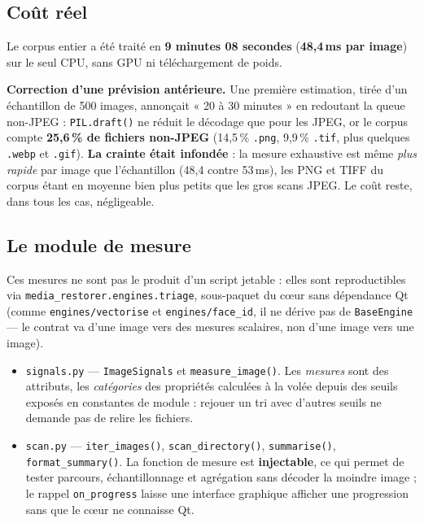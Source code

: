 \documentclass[11pt,a4paper]{article}
\newcommand{\alerte}[1]{\textcolor{alerte}{\textbf{#1}}}
\newcommand{\modtriage}{\texttt{media\_restorer.\allowbreak engines.\allowbreak triage}}
\begin{document}
\subsection{Coût réel}

Le corpus entier a été traité en \textbf{9 minutes 08 secondes}
(\textbf{48,4\,ms par image}) sur le seul CPU, sans GPU ni téléchargement de
poids.

\alerte{Correction d'une prévision antérieure.} Une première estimation, tirée
d'un échantillon de 500 images, annonçait « 20 à 30 minutes » en redoutant la
queue non-JPEG : \texttt{PIL.draft()} ne réduit le décodage que pour les JPEG,
or le corpus compte \textbf{25,6\,\% de fichiers non-JPEG} (14,5\,\%
\texttt{.png}, 9,9\,\% \texttt{.tif}, plus quelques \texttt{.webp} et
\texttt{.gif}). \textbf{La crainte était infondée} : la mesure exhaustive est
même \emph{plus rapide} par image que l'échantillon (48,4 contre 53\,ms), les
PNG et TIFF du corpus étant en moyenne bien plus petits que les gros scans
JPEG. Le coût reste, dans tous les cas, négligeable.

\subsection{Le module de mesure}
\label{sec:module}

Ces mesures ne sont pas le produit d'un script jetable : elles sont
reproductibles via \modtriage{}, sous-paquet du
c\oe ur sans dépendance Qt (comme \texttt{engines/vectorise} et
\texttt{engines/face\_id}, il ne dérive pas de \texttt{BaseEngine} — le contrat
va d'une image vers des mesures scalaires, non d'une image vers une image).

\begin{itemize}[leftmargin=*,itemsep=3pt]
  \item \texttt{signals.py} — \texttt{ImageSignals} et \texttt{measure\_image()}.
  Les \emph{mesures} sont des attributs, les \emph{catégories} des propriétés
  calculées à la volée depuis des seuils exposés en constantes de module :
  rejouer un tri avec d'autres seuils ne demande pas de relire les fichiers.
  \item \texttt{scan.py} — \texttt{iter\_images()}, \texttt{scan\_directory()},
  \texttt{summarise()}, \texttt{format\_summary()}. La fonction de mesure est
  \textbf{injectable}, ce qui permet de tester parcours, échantillonnage et
  agrégation sans décoder la moindre image ; le rappel \texttt{on\_progress}
  laisse une interface graphique afficher une progression sans que le c\oe ur
  ne connaisse Qt.
\end{itemize}
\end{document}
